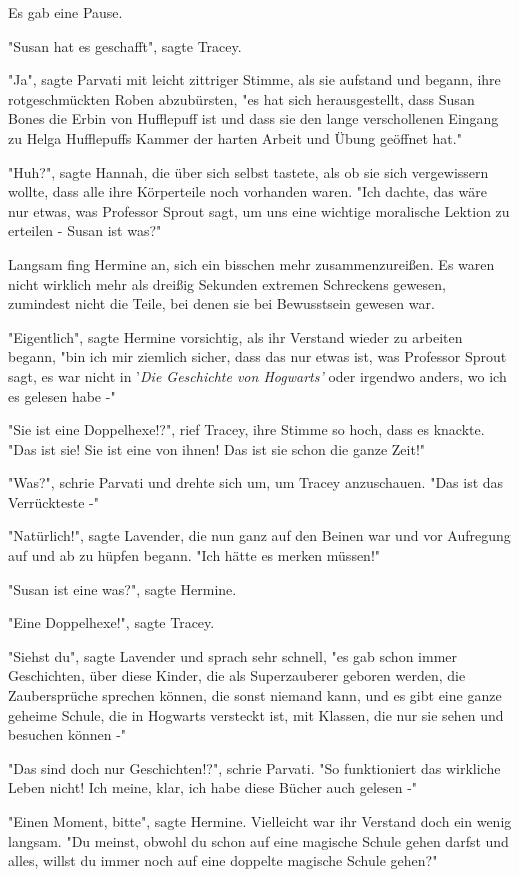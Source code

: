 {Es gab eine Pause.

"Susan hat es geschafft", sagte Tracey.

"Ja", sagte Parvati mit leicht zittriger Stimme, als sie aufstand und begann, ihre rotgeschmückten Roben abzubürsten, "es hat sich herausgestellt, dass Susan Bones die Erbin von Hufflepuff ist und dass sie den lange verschollenen Eingang zu Helga Hufflepuffs Kammer der harten Arbeit und Übung geöffnet hat."

"Huh?", sagte Hannah, die über sich selbst tastete, als ob sie sich vergewissern wollte, dass alle ihre Körperteile noch vorhanden waren. "Ich dachte, das wäre nur etwas, was Professor Sprout sagt, um uns eine wichtige moralische Lektion zu erteilen - Susan ist was?"

Langsam fing Hermine an, sich ein bisschen mehr zusammenzureißen. Es waren nicht wirklich mehr als dreißig Sekunden extremen Schreckens gewesen, zumindest nicht die Teile, bei denen sie bei Bewusstsein gewesen war.

"Eigentlich", sagte Hermine vorsichtig, als ihr Verstand wieder zu arbeiten begann, "bin ich mir ziemlich sicher, dass das nur etwas ist, was Professor Sprout sagt, es war nicht in '\emph{Die Geschichte von Hogwarts'} oder irgendwo anders, wo ich es gelesen habe -"

"Sie ist eine Doppelhexe!?", rief Tracey, ihre Stimme so hoch, dass es knackte. "Das ist sie! Sie ist eine von ihnen! Das ist sie schon die ganze Zeit!"

"Was?", schrie Parvati und drehte sich um, um Tracey anzuschauen. "Das ist das Verrückteste -"

"Natürlich!", sagte Lavender, die nun ganz auf den Beinen war und vor Aufregung auf und ab zu hüpfen begann. "Ich hätte es merken müssen!"

"Susan ist eine was?", sagte Hermine.

"Eine Doppelhexe!", sagte Tracey.

"Siehst du", sagte Lavender und sprach sehr schnell, "es gab schon immer Geschichten, über diese Kinder, die als Superzauberer geboren werden, die Zaubersprüche sprechen können, die sonst niemand kann, und es gibt eine ganze geheime Schule, die in Hogwarts versteckt ist, mit Klassen, die nur sie sehen und besuchen können -"

"Das sind doch nur Geschichten!?", schrie Parvati. "So funktioniert das wirkliche Leben nicht! Ich meine, klar, ich habe diese Bücher auch gelesen -"

"Einen Moment, bitte", sagte Hermine. Vielleicht war ihr Verstand doch ein wenig langsam. "Du meinst, obwohl du schon auf eine magische Schule gehen darfst und alles, willst du immer noch auf eine doppelte magische Schule gehen?"

}
